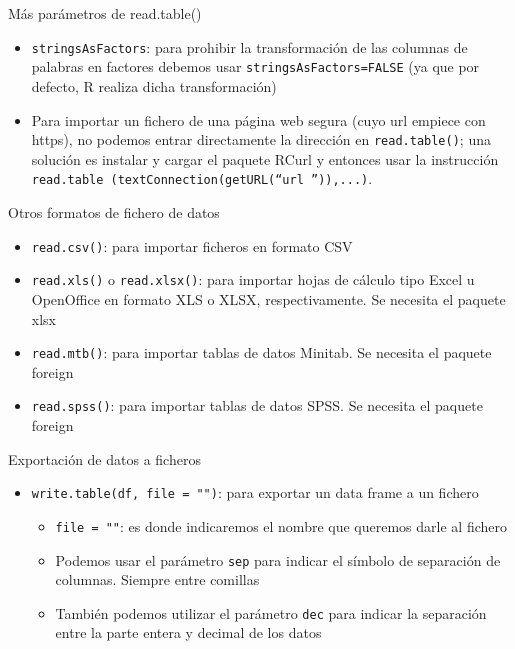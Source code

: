 \documentclass[
  ignorenonframetext,
]{beamer}
\providecommand{\tightlist}{%
  \setlength{\itemsep}{0pt}\setlength{\parskip}{0pt}}
\begin{document}
\begin{frame}[fragile]{Más parámetros de read.table()}
\label{muxe1s-paruxe1metros-de-read.table}
\begin{itemize}
\item
  \texttt{stringsAsFactors}: para prohibir la transformación de las
  columnas de palabras en factores debemos usar
  \texttt{stringsAsFactors=FALSE} (ya que por defecto, R realiza dicha
  transformación)
\item
  Para importar un fichero de una página web segura (cuyo url empiece
  con https), no podemos entrar directamente la dirección en
  \texttt{read.table()}; una solución es instalar y cargar el paquete
  RCurl y entonces usar la instrucción
  \texttt{read.table\ (textConnection(getURL(“url\ ”)),...)}.
\end{itemize}
\end{frame}

\begin{frame}[fragile]{Otros formatos de fichero de datos}
\label{otros-formatos-de-fichero-de-datos}
\begin{itemize}
\tightlist
\item
  \texttt{read.csv()}: para importar ficheros en formato CSV
\item
  \texttt{read.xls()} o \texttt{read.xlsx()}: para importar hojas de
  cálculo tipo Excel u OpenOffice en formato XLS o XLSX,
  respectivamente. Se necesita el paquete xlsx
\item
  \texttt{read.mtb()}: para importar tablas de datos Minitab. Se
  necesita el paquete foreign
\item
  \texttt{read.spss()}: para importar tablas de datos SPSS. Se necesita
  el paquete foreign
\end{itemize}
\end{frame}

\begin{frame}[fragile]{Exportación de datos a ficheros}
\label{exportaciuxf3n-de-datos-a-ficheros}
\begin{itemize}
\tightlist
\item
  \texttt{write.table(df,\ file\ =\ "")}: para exportar un data frame a
  un fichero

  \begin{itemize}
  \tightlist
  \item
    \texttt{file\ =\ ""}: es donde indicaremos el nombre que queremos
    darle al fichero
  \item
    Podemos usar el parámetro \texttt{sep} para indicar el símbolo de
    separación de columnas. Siempre entre comillas
  \item
    También podemos utilizar el parámetro \texttt{dec} para indicar la
    separación entre la parte entera y decimal de los datos
  \end{itemize}
\end{itemize}
\end{frame}
\end{document}

